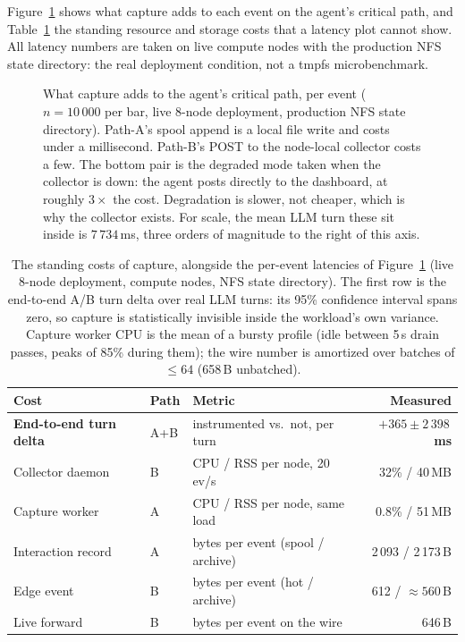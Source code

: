 Figure~\ref{fig:capture-overhead} shows what capture adds to each event on
the agent's critical path, and Table~\ref{tab:overhead} the standing
resource and storage costs that a latency plot cannot show. All latency
numbers are taken on live compute nodes with the production NFS state
directory: the real deployment condition, not a tmpfs microbenchmark.

\begin{figure}[h]
  \centering
  
  \caption[Capture overhead per event, by path]{What capture adds to the
  agent's critical path, per event ($n{=}10\,000$ per bar, live 8-node
  deployment, production NFS state directory). Path-A's spool append is a
  local file write and costs under a millisecond. Path-B's POST to the
  node-local collector costs a few. The bottom pair is the degraded mode
  taken when the collector is down: the agent posts directly to the
  dashboard, at roughly $3\times$ the cost. Degradation is slower, not
  cheaper, which is why the collector exists. For scale, the mean LLM turn
  these sit inside is $7\,734$\,ms, three orders of magnitude to the right
  of this axis.}
  \label{fig:capture-overhead}
\end{figure}

\begin{table}[h]
\centering
\small
\begin{tabular}{@{}lllr@{}}
\toprule
\textbf{Cost} & \textbf{Path} & \textbf{Metric} & \textbf{Measured} \\
\midrule
\textbf{End-to-end turn delta} & A{+}B & instrumented vs.\ not, per turn &
  \textbf{$+365 \pm 2\,398$\,ms} \\
Collector daemon      & B & CPU / RSS per node, 20\,ev/s     & 32\% / 40\,MB \\
Capture worker        & A & CPU / RSS per node, same load    & 0.8\% / 51\,MB \\
Interaction record    & A & bytes per event (spool / archive) & 2\,093 / 2\,173\,B \\
Edge event            & B & bytes per event (hot / archive)   & 612 / ${\approx}560$\,B \\
Live forward          & B & bytes per event on the wire       & 646\,B \\
\bottomrule
\end{tabular}
\caption[Capture overhead: standing costs]{The standing costs of capture,
alongside the per-event latencies of Figure~\ref{fig:capture-overhead}
(live 8-node deployment, compute nodes, NFS state directory).
The first row is the end-to-end A/B turn delta over real LLM turns:
its 95\% confidence interval spans zero, so capture is statistically
invisible inside the workload's own variance. Capture worker CPU is the
mean of a bursty profile (idle between 5\,s drain passes, peaks of 85\%
during them); the wire number is amortized over batches of ${\le}64$
(658\,B unbatched).}
\label{tab:overhead}
\end{table}

